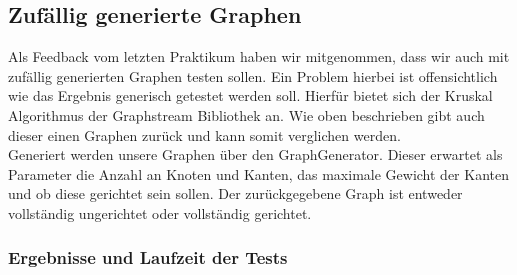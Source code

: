\documentclass[a4paper]{article}
\begin{document}
\subsection{Zufällig generierte Graphen}

Als Feedback vom letzten Praktikum haben wir mitgenommen, dass wir auch mit zufällig generierten Graphen testen sollen. Ein Problem hierbei ist offensichtlich wie das Ergebnis generisch getestet werden soll. Hierfür bietet sich der Kruskal Algorithmus der Graphstream Bibliothek an. Wie oben beschrieben gibt auch dieser einen Graphen zurück und kann somit verglichen werden.\\
Generiert werden unsere Graphen über den GraphGenerator. Dieser erwartet als Parameter die Anzahl an Knoten und Kanten, das maximale Gewicht der Kanten und ob diese gerichtet sein sollen. Der zurückgegebene Graph ist entweder vollständig ungerichtet oder vollständig gerichtet.

\subsubsection{Ergebnisse und Laufzeit der Tests}



\end{document}
